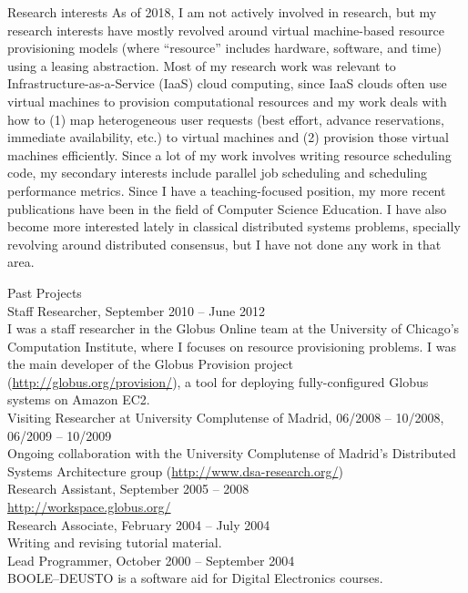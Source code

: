 \documentclass{resume}
\begin{document}
\begin{category}{Research interests}
\citembullet As of 2018, I am not actively involved in research, but my research interests have mostly revolved around virtual machine-based resource provisioning models (where ``resource'' includes hardware, software, and time) using a leasing abstraction. Most of my research work was relevant to Infrastructure-as-a-Service (IaaS) cloud computing, since IaaS clouds often use virtual machines to provision computational resources and my work deals with how to (1) map heterogeneous user requests (best effort, advance reservations, immediate availability, etc.) to virtual machines and (2) provision those virtual machines efficiently. Since a lot of my work involves writing resource scheduling code, my secondary interests include parallel job scheduling and scheduling performance metrics.
\citembullet Since I have a teaching-focused position, my more recent publications have been in the field of Computer Science Education. I have also become more interested lately in classical distributed systems problems, specially revolving around distributed consensus, but I have not done any work in that area.
\end{category}
\begin{category}{Past Projects}
\\
Staff Researcher, September 2010 -- June 2012\\
I was a staff researcher in the Globus Online team at the University of Chicago's Computation Institute, where I focuses on resource provisioning problems. I was the main developer of the Globus Provision project (\url{http://globus.org/provision/}), a tool for deploying fully-configured Globus systems on Amazon EC2.
\\
Visiting Researcher at University Complutense of Madrid, 06/2008 -- 10/2008, 06/2009 -- 10/2009\\
Ongoing collaboration with the University Complutense of Madrid's Distributed Systems Architecture group (\url{http://www.dsa-research.org/})
\\
Research Assistant, September 2005 -- 2008\\
\url{http://workspace.globus.org/}
\\
Research Associate, February 2004 -- July 2004\\
Writing and revising tutorial material.
\\ 
Lead Programmer, October 2000 -- September 2004\\
\textsf{BOOLE--DEUSTO} is a software aid for Digital Electronics courses.
\end{category}
\end{document}
